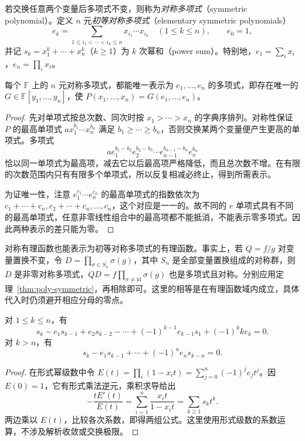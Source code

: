 \begin{definition}
\label{def:poly-symmetric}
若交换任意两个变量后多项式不变，则称为\emph{对称多项式}（symmetric polynomial）。定义 $n$ 元\emph{初等对称多项式}（elementary symmetric polynomials）
\[
    e_k=\sum_{1\leq i_1<\cdots<i_k\leq n}x_{i_1}\cdots x_{i_k}
    \quad(1\leq k\leq n),\qquad e_0=1,
\]
并记 $s_k=x_1^k+\cdots+x_n^k$（$k\geq1$）为 $k$ 次幂和（power sum）。特别地，$e_1=\sum_i x_i$，$e_n=\prod_i x_i$。
\end{definition}

\begin{theorem}[对称多项式基本定理]
\label{thm:poly-symmetric}
每个 $\mathbb F$ 上的 $n$ 元对称多项式，都能唯一表示为 $e_1,\ldots,e_n$ 的多项式，即存在唯一的 $G\in\mathbb F[y_1,\ldots,y_n]$，使 $P(x_1,\ldots,x_n)=G(e_1,\ldots,e_n)$。
\end{theorem}
\begin{proof}
先对单项式按总次数、同次时按 $x_1>\cdots>x_n$ 的字典序排列。对称性保证 $P$ 的最高单项式 $ax_1^{b_1}\cdots x_n^{b_n}$ 满足 $b_1\geq\cdots\geq b_n$，否则交换某两个变量便产生更高的单项式。多项式
\[
    ae_1^{b_1-b_2}e_2^{b_2-b_3}\cdots e_{n-1}^{b_{n-1}-b_n}e_n^{b_n}
\]
恰以同一单项式为最高项，减去它以后最高项严格降低，而且总次数不增。在有限的次数范围内只有有限多个单项式，所以反复相减必终止，得到所需表示。

为证唯一性，注意 $e_1^{c_1}\cdots e_n^{c_n}$ 的最高单项式的指数依次为 $c_1+\cdots+c_n,c_2+\cdots+c_n,\ldots,c_n$，这个对应是一一的。故不同的 $e$ 单项式具有不同的最高单项式，任意非零线性组合中的最高项都不能抵消，不能表示零多项式。因此两种表示的差只能为零。
\end{proof}

对称有理函数也能表示为初等对称多项式的有理函数。事实上，若 $Q=f/g$ 对变量置换不变，令 $D=\prod_{\sigma\in S_n}\sigma(g)$，其中 $S_n$ 是全部变量置换组成的对称群，则 $D$ 是非零对称多项式，$QD=f\prod_{\sigma\ne\mathrm{id}}\sigma(g)$ 也是多项式且对称。分别应用定理~\ref{thm:poly-symmetric}，再相除即可。这里的相等是在有理函数域内成立，具体代入时仍须避开相应分母的零点。

\begin{theorem}
\label{thm:poly-newton}
对 $1\leq k\leq n$，有
\begin{equation}
\label{eq:poly-newton-low}
    s_k-e_1s_{k-1}+e_2s_{k-2}-\cdots+(-1)^{k-1}e_{k-1}s_1+(-1)^kke_k=0.
\end{equation}
对 $k>n$，有
\begin{equation}
\label{eq:poly-newton-high}
    s_k-e_1s_{k-1}+\cdots+(-1)^ne_ns_{k-n}=0.
\end{equation}
\end{theorem}
\begin{proof}
在形式幂级数中令 $E(t)=\prod_i(1-x_it)=\sum_{j=0}^n(-1)^je_jt^j$。因 $E(0)=1$，它有形式乘法逆元，乘积求导给出
\[
    -\frac{tE'(t)}{E(t)}=\sum_{i=1}^n\frac{x_it}{1-x_it}
    =\sum_{k\geq1}s_kt^k.
\]
两边乘以 $E(t)$，比较各次系数，即得两组公式。这里使用形式级数的系数运算，不涉及解析收敛或交换极限。
\end{proof}

